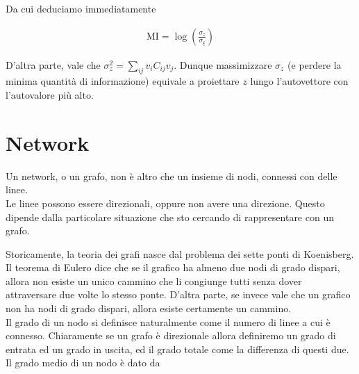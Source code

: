 \documentclass{report}
\begin{document}
Da cui deduciamo immediatamente 

\begin{align}
    \text{MI} = \log\left(\frac{\sigma_z}{\sigma_\xi}\right)
\end{align}

D'altra parte, vale che \(\sigma^2_z = \sum_{ij}v_i C_{ij}v_j\). Dunque massimizzare \(\sigma_z\) (e perdere la minima quantità di informazione) equivale a proiettare \(z\) lungo l'autovettore con l'autovalore più alto. 

\chapter{Network}

Un network, o un grafo, non è altro che un insieme di nodi, connessi con delle linee. \\

Le linee possono essere direzionali, oppure non avere una direzione. Questo dipende dalla particolare situazione che sto cercando di rappresentare con un grafo. 


Storicamente, la teoria dei grafi nasce dal problema dei sette ponti di Koenisberg. Il teorema di Eulero dice che se il grafico ha almeno due nodi di grado dispari, allora non esiste un unico cammino che li congiunge tutti senza dover attraversare due volte lo stesso ponte. D'altra parte, se invece vale che un grafico non ha nodi di grado dispari, allora esiste certamente un cammino. \\

Il grado di un nodo si definisce naturalmente come il numero di linee a cui è connesso. Chiaramente se un grafo è direzionale allora definiremo un grado di entrata ed un grado in uscita, ed il grado totale come la differenza di questi due. Il grado medio di un nodo è dato da 
\end{document}
